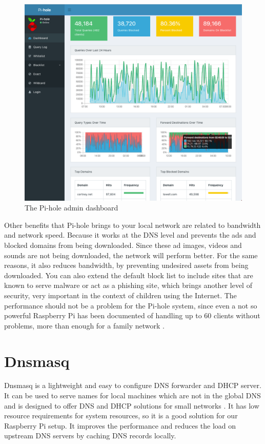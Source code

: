 \begin{figure}[th]
\centering
\includegraphics[width=1\textwidth]{Figures/pihole-admin}
\decoRule
\caption{The Pi-hole admin dashboard}
\label{fig:pihole-admin}
\end{figure}

Other benefits that Pi-hole brings to your local network are related to bandwidth and network speed. Because it works at the DNS level and prevents the ads and blocked domains from being downloaded. Since these ad images, videos and sounds are not being downloaded, the network will perform better. For the same reasons, it also reduces bandwidth, by preventing undesired assets from being downloaded. You can also extend the default block list to include sites that are known to serve malware or act as a phishing site, which brings another level of security, very important in the context of children using the Internet. The performance should not be a problem for the Pi-hole system, since even a not so powerful Raspberry Pi has been documented of handling up to 60 clients without problems, more than enough for a family network \citep{salmela20177things}.

\section{Dnsmasq}

Dnsmasq is a lightweight and easy to configure DNS forwarder and DHCP server. It can be used to serve names for local machines which are not in the global DNS and is designed to offer DNS and DHCP solutions for small networks \citep{debianHowToDnsmasq}.
It has low resource requirements for system resources, so it is a good solution for our Raspberry Pi setup. It improves the performance and reduces the load on upstream DNS servers by caching DNS records locally.

